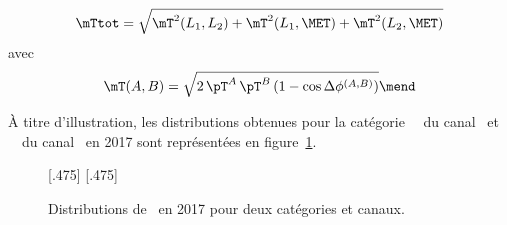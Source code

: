 \begin{equation}
\mTtot = \sqrt{\mT^2 (L_1,L_2) + \mT^2 (L_1,\MET) + \mT^2 (L_2,\MET)}
\label{eq-def_mTtot}
\end{equation}
avec
\begin{equation}
\mT (A,B) = \sqrt{2 \, \pT^{A} \, \pT^{B} \, (1-\cos\Delta\phi^{(A,B)})}
\mend
\end{equation}
\par
À titre d'illustration, les distributions obtenues pour la catégorie \CATbtag\ \CATtightmt\ du canal \mu\tauh\ et \CATbtag\ \CATmediumdz\ du canal \ele\mu\ en 2017 sont représentées en figure~\ref{fig-mTtot_distribs_exemple}.
\begin{figure}[h]
\centering

[.475\textwidth]
{}
\hfill
{}[.475\textwidth]
{}

\caption[Distributions de \mTtot\ en 2017 pour deux catégories et canaux.]{Distributions de \mTtot\ en 2017 pour deux catégories et canaux.}
\label{fig-mTtot_distribs_exemple}
\end{figure}
